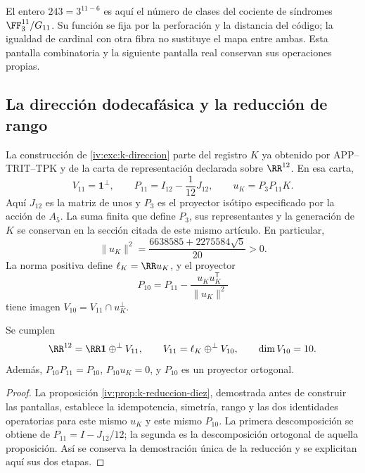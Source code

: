 El entero \(243=3^{11-6}\) es aquí el número de clases
del cociente de síndromes \(\FF_3^{11}/G_{11}\). Su
función se fija por la perforación y la distancia del
código; la igualdad de cardinal con otra fibra no sustituye
el mapa entre ambas. Esta pantalla combinatoria y la
siguiente pantalla real conservan sus operaciones propias.

\subsection{La dirección dodecafásica y la reducción de rango}

La construcción de \ref{iv:exc:k-direccion} parte del registro
\(K\) ya obtenido por APP--TRIT--TPK y de la carta de
representación declarada sobre \(\RR^{12}\). En esa carta,
\begin{equation}
 V_{11}=\mathbf1^\perp,\qquad
 P_{11}=I_{12}-\frac1{12}J_{12},\qquad
 u_K=P_3P_{11}K.
 \label{iv:iv:eq:p11-uk}
\end{equation}
Aquí \(J_{12}\) es la matriz de unos y \(P_3\) es el
proyector isótipo especificado por la acción de \(A_5\).
La suma finita que define \(P_3\), sus representantes y la
generación de \(K\) se conservan en la sección citada de
este mismo artículo. En particular,
\[
 \|u_K\|^2=\frac{6638585+2275584\sqrt5}{20}>0.
\]
La norma positiva define \(\ell_K=\RR u_K\), y el
proyector
\begin{equation}
 P_{10}=P_{11}-\frac{u_Ku_K^{\mathsf T}}{\|u_K\|^2}
 \label{iv:iv:eq:p10}
\end{equation}
tiene imagen \(V_{10}=V_{11}\cap u_K^\perp\).

\begin{proposition}
\label{iv:iv:prop:12-11-10}
Se cumplen
\[
 \RR^{12}=\RR\mathbf1\mathbin{\oplus^\perp}V_{11},\qquad
 V_{11}=\ell_K\mathbin{\oplus^\perp}V_{10},\qquad
 \dim V_{10}=10.
\]
Además, \(P_{10}P_{11}=P_{10}\), \(P_{10}u_K=0\), y
\(P_{10}\) es un proyector ortogonal.
\end{proposition}
\begin{proof}
La proposición \ref{iv:prop:k-reduccion-diez}, demostrada antes de
construir las pantallas, establece la idempotencia, simetría, rango y
las dos identidades operatorias para este mismo \(u_K\) y este mismo
\(P_{10}\). La primera descomposición se obtiene de
\(P_{11}=I-J_{12}/12\); la segunda es la descomposición ortogonal
de aquella proposición. Así se conserva la demostración única de la
reducción y se explicitan aquí sus dos etapas.
\end{proof}

